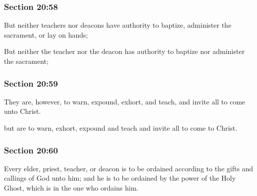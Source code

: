 	\subsubsection{Section 20:58} %
		\label{DC20-58}

		But neither teachers nor deacons have authority to baptize, administer the sacrament, or lay on hands;

		\begin{framed}
		\scriptsize
			\begin{compactdesc}
				\item[JSP] But neither the teacher nor the deacon has authority to baptize nor administer the sacrament; 
				\item[RB1] 
				\item[BC] 
			\end{compactdesc}
		\end{framed}

	\subsubsection{Section 20:59} %
		\label{DC20-59}

		They are, however, to warn, expound, exhort, and teach, and invite all to come unto Christ.

		\begin{framed}
		\scriptsize
			\begin{compactdesc}
				\item[JSP] but are to warn, exhort, expound and teach and invite all to come to Christ. 
				\item[RB1] 
				\item[BC] 
			\end{compactdesc}
		\end{framed}

	\subsubsection{Section 20:60} %
		\label{DC20-60}

		Every elder, priest, teacher, or deacon is to be ordained according to the gifts and callings of God unto him; and he is to be ordained by the power of the Holy Ghost, which is in the one who ordains him.

